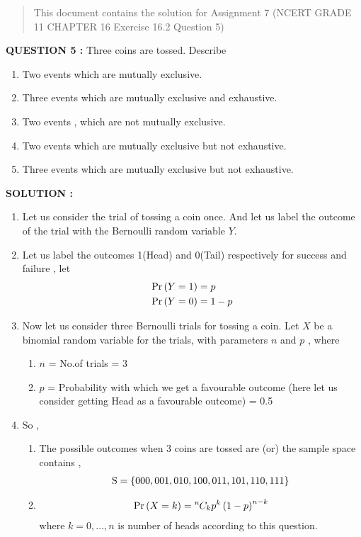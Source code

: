 \documentclass[journal,12pt,twocolumn]{IEEEtran}
\begin{document}
%
\begin{abstract}
This document contains the solution for Assignment 7 (NCERT GRADE 11 CHAPTER 16 Exercise 16.2 Question 5)
\end{abstract}
\textbf{QUESTION 5 :}
Three coins are tossed. Describe 
\begin{enumerate}[label=(\roman{enumi})]
    \item Two events which are mutually exclusive.
    \item Three events which are mutually exclusive and exhaustive.
    \item Two events , which are not mutually exclusive.
    \item Two events which are mutually exclusive but not exhaustive.
    \item Three events which are mutually exclusive but not exhaustive.
\end{enumerate}
\textbf{SOLUTION :}
\begin{enumerate}
    \item Let us consider the trial of tossing a coin once. And let us label the outcome of the trial with the Bernoulli random variable $Y$.
    \item Let us label the outcomes 1(Head) and 0(Tail) respectively for success and failure , let
    \begin{align}
        \Pr\left(Y=1\right) &= p \\
        \Pr\left(Y=0\right) &= 1-p
    \end{align}
    \item Now let us consider three Bernoulli trials for tossing a coin. Let $X$ be a binomial random variable for the trials, with parameters $n$ and $p$ , where
    \begin{enumerate}
        \item $n$ = No.of trials = 3
        \item $p$ = Probability with which we get a favourable outcome (here let us consider getting Head as a favourable outcome) = 0.5
    \end{enumerate}
    \item So ,
    \begin{enumerate}
        \item The possible outcomes when 3 coins are tossed are (or) the sample space contains ,
        \begin{align}
    	    \text{S} = \left\{000,001,010,100,011,101,110,111\right\}
        \end{align}
        \item 
        \begin{align}
            \Pr\left(X = k\right) = {{}^{n}\mkern-1muC_{k}} p^k\left(1-p\right)^{n-k}
        \end{align}
        where $k= 0,\dots, n$ is number of heads according to this question.
    \end{enumerate}
\end{enumerate}
\end{document}
